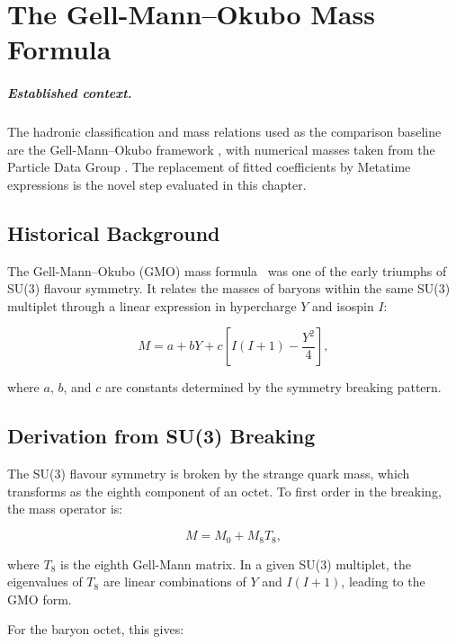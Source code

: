 \chapter{The Gell-Mann--Okubo Mass Formula}
\label{ch:gmo_formula}


\paragraph{Established context.}
The hadronic classification and mass relations used as the comparison baseline
are the Gell-Mann--Okubo framework
\cite{gellmann1961,GellMann1962,okubo1962}, with numerical masses taken from the
Particle Data Group \cite{PDG2024}.  The replacement of fitted coefficients by
Metatime expressions is the novel step evaluated in this chapter.

\section{Historical Background}

The Gell-Mann--Okubo (GMO) mass formula~\cite{gellmann1961,okubo1962}
was one of the early triumphs of SU(3) flavour symmetry.  It relates the
masses of baryons within the same SU(3) multiplet through a linear
expression in hypercharge \(Y\) and isospin \(I\):

\begin{equation}
M = a + bY + c\left[I(I+1) - \frac{Y^2}{4}\right],
\label{eq:gmo_standard}
\end{equation}

where \(a\), \(b\), and \(c\) are constants determined by the symmetry
breaking pattern.

\section{Derivation from SU(3) Breaking}

The SU(3) flavour symmetry is broken by the strange quark mass, which
transforms as the eighth component of an octet.  To first order in the
breaking, the mass operator is:

\[
M = M_0 + M_8 T_8,
\]

where \(T_8\) is the eighth Gell-Mann matrix.  In a given SU(3) multiplet,
the eigenvalues of \(T_8\) are linear combinations of \(Y\) and \(I(I+1)\),
leading to the GMO form.

For the baryon octet, this gives:

